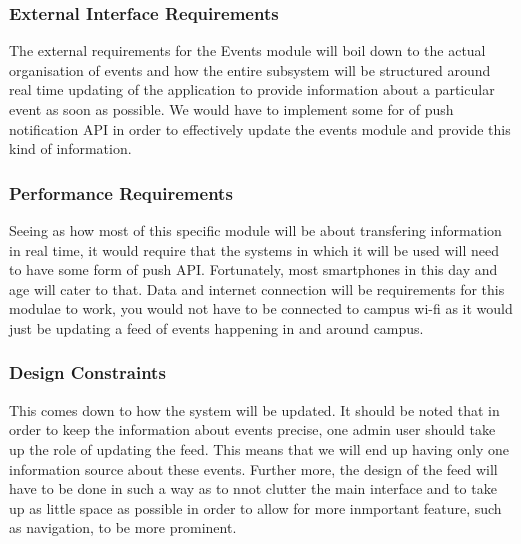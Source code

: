 \documentclass{article}
\begin{document}
			\subsubsection{External Interface Requirements}
					The external requirements for the Events module will boil down to the actual organisation of events and how the entire subsystem will be structured around real time updating of the application to provide information about a particular event as soon as possible. We would have to implement some for of push notification API in order to effectively update the events module and provide this kind of information.

			\subsubsection{Performance Requirements}
					Seeing as how most of this specific module will be about transfering information in real time, it would require that the systems in which it will be used will need to have some form of push API. Fortunately, most smartphones in this day and age will cater to that. Data and internet connection will be requirements for this modulae to work, you would not have to be connected to campus wi-fi as it would just be updating a feed of events happening in and around campus.
		
			\subsubsection{Design Constraints}
					This comes down to how the system will be updated. It should be noted that in order to keep the information about events precise, one admin user should take up the role of updating the feed. This means that we will end up having only one information source about these events. Further more, the design of the feed will have to be done in such a way as to nnot clutter the main interface and to take up as little space as possible in order to allow for more inmportant feature, such as navigation, to be more prominent.
\end{document}
